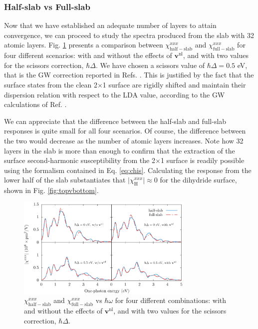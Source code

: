 \subsubsection{Half-slab vs Full-slab}

Now that we have established an adequate number of layers to attain convergence,
we can proceed to study the spectra produced from the slab with 32 atomic
layers. Fig. \ref{fig:hsvfs} presents a comparison between
$\chi^{xxx}_{\mathrm{half-slab}}$ and $\chi^{xxx}_{\mathrm{full-slab}}$ for four
different scenarios: with and without the effects of $\mathbf{v}^\mathrm{nl}$,
and with two values for the scissors correction, $\hbar\Delta$. We have chosen a
scissors value of $\hbar\Delta=0.5$ eV, that is the GW correction reported in
Refs. \cite{rohlfingPRB95, garciaCPC01}. This is justified by the fact that the
surface states from the clean 2$\times$1 surface are rigidly shifted and
maintain their dispersion relation with respect to the LDA value, according to
the GW calculations of Ref. \cite{rohlfingPRB95}.

We can appreciate that the difference between the half-slab and full-slab
responses is quite small for all four scenarios. Of course, the difference
between the two would decrease as the number of atomic layers increases. Note
how 32 layers in the slab is more than enough to confirm that the extraction of
the surface second-harmonic susceptibility from the 2$\times$1 surface is
readily possible using the formalism contained in Eq. \eqref{eq:chis}.
Calculating the response from the lower half of the slab substantiates that
$\vert\chi^{xxx}_{\mathrm{H}}\vert\approx 0$ for the dihydride surface,
shown in Fig. \ref{fig:topvbottom}.

\begin{figure}[t]
\centering 
\includegraphics[width=0.75\textwidth]{content/figures/fig-Si2x1-hsvsfs}
\caption[Different scenarios of half-slab vs full-slab.]
{$\chi^{xxx}_{\mathrm{half-slab}}$ and $\chi^{xxx}_{\mathrm{full-slab}}$
vs $\hbar\omega$ for four different combinations: with and without the effects
of $\mathbf{v}^\mathrm{nl}$, and with two values for the scissors correction,
$\hbar\Delta$.}
\label{fig:hsvfs}
\end{figure}

